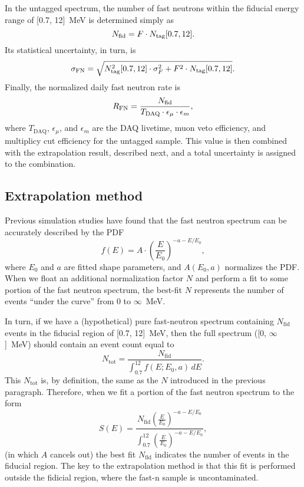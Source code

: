 \documentclass[../thesis.tex]{subfiles}
\begin{document}
In the untagged spectrum, the number of fast neutrons within the fiducial energy range of [0.7, 12]~MeV is determined simply as
\[ N_\mathrm{fid} = F \cdot N_\mathrm{tag}[0.7, 12]. \] Its statistical uncertainty, in turn, is
\begin{equation}
  \label{eq:fastn_scal_unc}
  \sigma_\mathrm{FN} = \sqrt{N_\mathrm{tag}^2[0.7, 12]
    \cdot \sigma_F^2 + F^2 \cdot N_\mathrm{tag}[0.7, 12]}.
\end{equation}
Finally, the normalized daily fast neutron rate is
\begin{equation}
  \label{eq:fastn_rate}
  R_\mathrm{FN} = \frac{N_\mathrm{fid}}{T_\mathrm{DAQ} \cdot \epsilon_\mu \cdot \epsilon_m},
\end{equation}
where $T_\mathrm{DAQ}$, $\epsilon_\mu$, and $\epsilon_m$ are the DAQ livetime, muon veto efficiency, and multiplicy cut efficiency for the untagged sample. This value is then combined with the extrapolation result, described next, and a total uncertainty is assigned to the combination.

\subsection{Extrapolation method}
\label{sec:fastn_extrap}

Previous simulation studies have found that the fast neutron spectrum can be accurately described by the PDF
\begin{equation}
  \label{eq:bkgFastnShape}
  f(E) = A \cdot \left( \frac{E}{E_0} \right)^{-a-E/E_0},  
\end{equation}
where $E_0$ and $a$ are fitted shape parameters, and $A(E_0, a)$ normalizes the PDF. When we float an additional normalization factor $N$ and perform a fit to some portion of the fast neutron spectrum, the best-fit $N$ represents the number of events ``under the curve'' from 0 to $\infty$~MeV.

In turn, if we have a (hypothetical) pure fast-neutron spectrum containing $N_\mathrm{fid}$ events in the fiducial region of [0.7, 12]~MeV, then the full spectrum ([0, $\infty$]~MeV) should contain an event count equal to
\[ N_\mathrm{tot} = \frac{N_\mathrm{fid}}{\int_{0.7}^{12} f(E; E_0, a)\,dE }. \] This $N_\mathrm{tot}$ is, by definition, the same as the $N$ introduced in the previous paragraph. Therefore, when we fit a portion of the fast neutron spectrum to the form
\begin{equation}
  \label{eq:fastn_extrap_form}
  S(E) = \frac{N_\mathrm{fid} \left( \frac{E}{E_0} \right)^{-a-E/E_0}}
  {\int_{0.7}^{12} \left( \frac{E}{E_0} \right)^{-a-E/E_0} },
\end{equation}
(in which $A$ cancels out) the best fit $N_\mathrm{fid}$ indicates the number of events in the fiducial region. The key to the extrapolation method is that this fit is performed outside the fidicial region, where the fast-n sample is uncontaminated.
\end{document}
